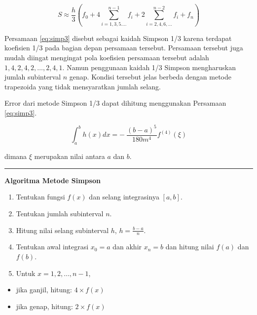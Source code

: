 \documentclass[]{book}
\providecommand{\tightlist}{%
  \setlength{\itemsep}{0pt}\setlength{\parskip}{0pt}}
\theoremstyle{definition}
\theoremstyle{definition}
\theoremstyle{definition}
\theoremstyle{remark}
\begin{document}
\begin{equation}
S\approx\frac{h}{3}\left(f_0+4\sum_{i=1,3,5.\dots}^{n-1}f_i+2\sum_{i=2,4,6,\dots}^{n-2}f_i+f_n\right)
  \label{eq:simp3}
\end{equation}

Persamaan \eqref{eq:simp3} disebut sebagai kaidah Simpson 1/3 karena terdapat koefisien 1/3 pada bagian depan persamaan tersebut. Persamaan tersebut juga mudah diingat mengingat pola koefisien persamaan tersebut adalah \(1,4,2,4,2,\dots ,2,4,1\). Namun penggunaan kaidah 1/3 Simpson mengharuskan jumlah subinterval \(n\) genap. Kondisi tersebut jelas berbeda dengan metode trapezoida yang tidak mensyaratkan jumlah selang.

Error dari metode Simpson 1/3 dapat dihitung menggunakan Persamaan \eqref{eq:simp3}.

\begin{equation}
\int_a^bh\left(x\right)dx=-\ \frac{\left(b-a\right)^5}{180m^4}f^{\left(4\right)}\left(\xi\right)
  \label{eq:simp4}
\end{equation}

dimana \(\xi\) merupakan nilai antara \(a\) dan \(b\).

\begin{center}\rule{0.5\linewidth}{\linethickness}\end{center}

\textbf{Algoritma Metode Simpson}

\begin{enumerate}
\def\labelenumi{\arabic{enumi}.}
\tightlist
\item
  Tentukan fungsi \(f\left(x\right)\) dan selang integrasinya \(\left[a,b\right]\).
\item
  Tentukan jumlah subinterval \(n\).
\item
  Hitung nilai selang subinterval \(h\), \(h=\frac{b-a}{n}\).
\item
  Tentukan awal integrasi \(x_0=a\) dan akhir \(x_n=b\) dan hitung nilai \(f\left(a\right)\) dan \(f\left(b\right)\).
\item
  Untuk \(x=1,2,\dots,n-1\),
\end{enumerate}

\begin{itemize}
\tightlist
\item
  jika ganjil, hitung: \(4\times f\left(x\right)\)
\item
  jika genap, hitung: \(2\times f\left(x\right)\)
\end{itemize}
\end{document}
